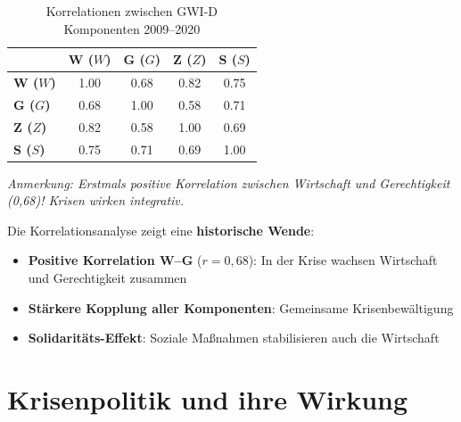 \begin{table}[ht]
    \centering
    \caption{Korrelationen zwischen GWI-D Komponenten 2009–2020}
    \label{tab:korrelation_krisen}
    \begin{tabular}{lcccc}
        \toprule
        & \textbf{W (\(W\))} & \textbf{G (\(G\))} & \textbf{Z (\(Z\))} & \textbf{S (\(S\))} \\
        \midrule
        \textbf{W (\(W\))} & 1.00 & 0.68 & 0.82 & 0.75 \\
        \textbf{G (\(G\))} & 0.68 & 1.00 & 0.58 & 0.71 \\
        \textbf{Z (\(Z\))} & 0.82 & 0.58 & 1.00 & 0.69 \\
        \textbf{S (\(S\))} & 0.75 & 0.71 & 0.69 & 1.00 \\
        \bottomrule
    \end{tabular}
\end{table}

\begin{flushleft}
\footnotesize{\textit{Anmerkung: Erstmals positive Korrelation zwischen Wirtschaft und Gerechtigkeit (0,68)! Krisen wirken integrativ.}}
\end{flushleft}

Die Korrelationsanalyse zeigt eine \textbf{historische Wende}:

\begin{itemize}
    \item \textbf{Positive Korrelation W–G} (\(r = 0,68\)): In der Krise wachsen Wirtschaft und Gerechtigkeit zusammen
    \item \textbf{Stärkere Kopplung aller Komponenten}: Gemeinsame Krisenbewältigung
    \item \textbf{Solidaritäts-Effekt}: Soziale Maßnahmen stabilisieren auch die Wirtschaft
\end{itemize}

\section{Krisenpolitik und ihre Wirkung}

